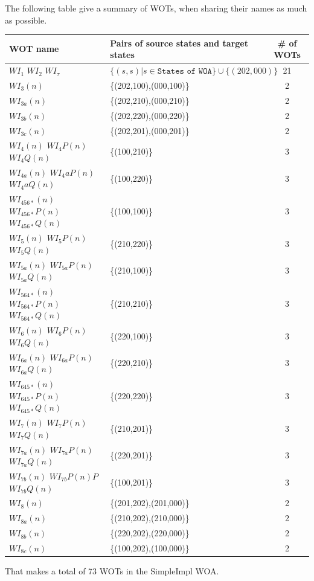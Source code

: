 \documentclass{lmcs}
\begin{document}
\bigskip
The following table give a summary of  WOTs, when sharing their names as much as possible.

\begin{tabular}{|l|l|c|}
\hline
    WOT name & Pairs of source states and target states & \# of WOTs \\
    \hline
    $WI_1$ $WI_2$ $WI_\tau$ & $\{(s,s)| s \in \texttt{States of WOA}\} \cup \{(202,000)\} $ & 21 \\
    $WI_3(n)$ & \{(202,100),(000,100)\} & 2 \\
    $WI_{3a}(n)$ & \{(202,210),(000,210)\} & 2 \\
    $WI_{3b}(n)$ & \{(202,220),(000,220)\} & 2 \\
    $WI_{3c}(n)$ & \{(202,201),(000,201)\} & 2 \\
    $WI_4(n)$ $WI_4P(n)$ $WI_4Q(n)$ & \{(100,210)\} & 3 \\
    $WI_{4a}(n)$ $WI_4aP(n)$ $WI_4aQ(n)$ & \{(100,220)\} & 3 \\
    $WI_{456*}(n) $ $WI_{456*}P(n) $ $WI_{456*}Q(n) $ & \{(100,100)\} & 3 \\
    $WI_5(n)$ $WI_5P(n)$ $WI_5Q(n)$ & \{(210,220)\} & 3 \\
    $WI_{5a}(n)$ $WI_{5a}P(n)$ $WI_{5a}Q(n)$ & \{(210,100)\} & 3 \\
    $WI_{564*}(n) $ $WI_{564*}P(n) $ $WI_{564*}Q(n) $ & \{(210,210)\} & 3 \\
    $WI_6(n)$ $WI_6P(n)$ $WI_6Q(n)$ & \{(220,100)\} & 3 \\
    $WI_{6a}(n)$ $WI_{6a}P(n)$ $WI_{6a}Q(n)$ & \{(220,210)\} & 3 \\
    $WI_{645*}(n) $ $WI_{645*}P(n) $ $WI_{645*}Q(n) $ & \{(220,220)\} & 3 \\
    $WI_7(n)$ $WI_7P(n)$ $WI_7Q(n)$ & \{(210,201)\} & 3 \\
    $WI_{7a}(n)$ $WI_{7a}P(n)$ $WI_{7a}Q(n)$ & \{(220,201)\} & 3 \\
    $WI_{7b}(n)$ $WI_{7b}P(n)P$ $WI_{7b}Q(n)$ & \{(100,201)\} & 3 \\
    $WI_8(n)$ & \{(201,202),(201,000)\} & 2\\ 
    $WI_{8a}(n)$ & \{(210,202),(210,000)\} & 2 \\
    $WI_{8b}(n)$ & \{(220,202),(220,000)\} & 2 \\
    $WI_{8c}(n)$ & \{(100,202),(100,000)\} & 2 \\
   
    \hline
    \end{tabular}
    \bigskip
    That makes a total of 73 WOTs  in the SimpleImpl WOA.
\end{document}
